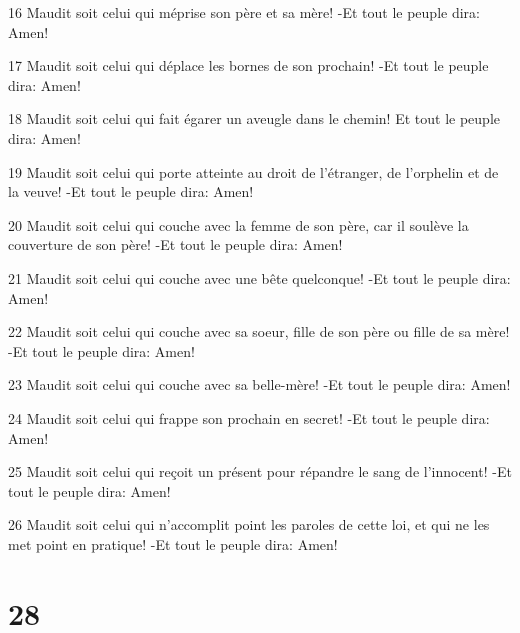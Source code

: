 \par 16 Maudit soit celui qui méprise son père et sa mère! -Et tout le peuple dira: Amen!
\par 17 Maudit soit celui qui déplace les bornes de son prochain! -Et tout le peuple dira: Amen!
\par 18 Maudit soit celui qui fait égarer un aveugle dans le chemin! Et tout le peuple dira: Amen!
\par 19 Maudit soit celui qui porte atteinte au droit de l'étranger, de l'orphelin et de la veuve! -Et tout le peuple dira: Amen!
\par 20 Maudit soit celui qui couche avec la femme de son père, car il soulève la couverture de son père! -Et tout le peuple dira: Amen!
\par 21 Maudit soit celui qui couche avec une bête quelconque! -Et tout le peuple dira: Amen!
\par 22 Maudit soit celui qui couche avec sa soeur, fille de son père ou fille de sa mère! -Et tout le peuple dira: Amen!
\par 23 Maudit soit celui qui couche avec sa belle-mère! -Et tout le peuple dira: Amen!
\par 24 Maudit soit celui qui frappe son prochain en secret! -Et tout le peuple dira: Amen!
\par 25 Maudit soit celui qui reçoit un présent pour répandre le sang de l'innocent! -Et tout le peuple dira: Amen!
\par 26 Maudit soit celui qui n'accomplit point les paroles de cette loi, et qui ne les met point en pratique! -Et tout le peuple dira: Amen!

\chapter{28}

